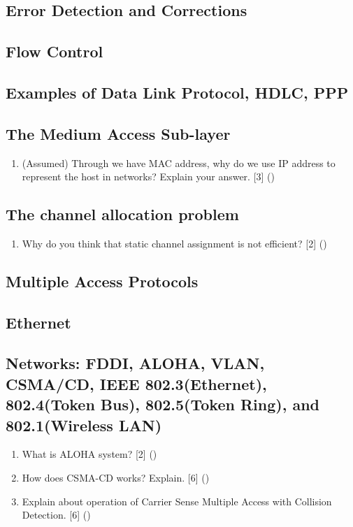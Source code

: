 \documentclass[12pt]{article}
\begin{document}
	\subsection{Error Detection and Corrections}
	\subsection{Flow Control}
	\subsection{Examples of Data Link Protocol, HDLC, PPP}
	\subsection{The Medium Access Sub-layer}
		\begin{enumerate}[noitemsep, topsep=0pt]
			\item (Assumed) Through we have MAC address, why do we use IP address to represent the host in networks? Explain your answer. \hfill [3] ()
		\end{enumerate}
	\subsection{The channel allocation problem}
		\begin{enumerate}[noitemsep, topsep=0pt]
			\item Why do you think that static channel assignment is not efficient? \hfill [2] () 
		\end{enumerate}
	\subsection{Multiple Access Protocols}
	\subsection{Ethernet}
	\subsection{Networks: FDDI, ALOHA, VLAN, CSMA/CD, IEEE 802.3(Ethernet), 802.4(Token Bus), 802.5(Token Ring), and 802.1(Wireless LAN)}
		\begin{enumerate}[noitemsep, topsep=0pt]
			\item What is ALOHA system? \hfill [2] ()
			
			\item How does CSMA-CD works? Explain. \hfill [6] ()
			
			\item Explain about operation of Carrier Sense Multiple Access with Collision Detection. \hfill [6] ()
		\end{enumerate}
			
\end{document}
